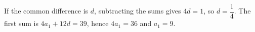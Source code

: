 If the common difference is $d$, subtracting the sums gives $4d=1$, so $d=\dfrac{1}{4}$. The first sum is $4a_1+12d=39$, hence $4a_1=36$ and $\boxed{a_1=9}$.
